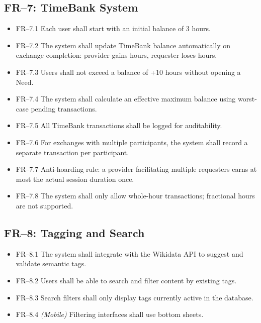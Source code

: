 \documentclass[10pt,a4paper]{report}
\begin{document}
\subsection{FR--7: TimeBank System}
\begin{itemize}
    \item FR--7.1 Each user shall start with an initial balance of 3 hours.
    \item FR--7.2 The system shall update TimeBank balance automatically on exchange completion: provider gains hours, requester loses hours.
    \item FR--7.3 Users shall not exceed a balance of +10 hours without opening a Need.
    \item FR--7.4 The system shall calculate an effective maximum balance using worst-case pending transactions.
    \item FR--7.5 All TimeBank transactions shall be logged for auditability.
    \item FR--7.6 For exchanges with multiple participants, the system shall record a separate transaction per participant.
    \item FR--7.7 Anti-hoarding rule: a provider facilitating multiple requesters earns at most the actual session duration once.
    \item FR--7.8 The system shall only allow whole-hour transactions; fractional hours are not supported.
\end{itemize}

\subsection{FR--8: Tagging and Search}
\begin{itemize}
    \item FR--8.1 The system shall integrate with the Wikidata API to suggest and validate semantic tags.
    \item FR--8.2 Users shall be able to search and filter content by existing tags.
    \item FR--8.3 Search filters shall only display tags currently active in the database.
    \item FR--8.4 \textit{(Mobile)} Filtering interfaces shall use bottom sheets.
\end{itemize}
\end{document}
